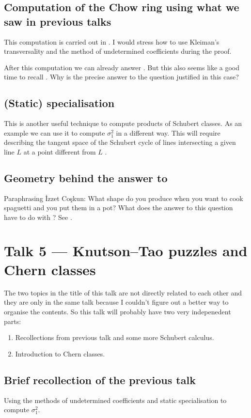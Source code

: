 \documentclass[A4paper, 12pt, british, reqno]{amsart}
\theoremstyle{plain}
\theoremstyle{definition}
\theoremstyle{remark}
\theoremstyle{plain}
\theoremstyle{definition}
\theoremstyle{remark}
\theoremstyle{plain}
\theoremstyle{definition}
\theoremstyle{remark}
\begin{document}
\subsection{Computation of the Chow ring using what we saw in previous talks}
This computation is carried out in \cite[Thm.~3.10]{eh16}.
I would stress how to use Kleiman's transversality \cite[Thm.~1.7]{eh16} and the method of undetermined coefficients during the proof.

After this computation we can already answer .
But this also seems like a good time to recall .
Why is the precise answer to the question justified in this case?

\subsection{(Static) specialisation \cite[\S 3.5.1]{eh16}}
This is another useful technique to compute products of Schubert classes.
As an example we can use it to compute $\sigma_{1}^{2}$ in a different way.
This will require describing the tangent space of the Schubert cycle of lines intersecting a given line $L$ at a point different from $L$ \cite[Exe.~3.26]{eh16}.

\subsection{Geometry behind the answer to }
Paraphrasing \.{I}zzet Co\c{s}kun: What shape do you produce when you want to cook spaguetti and you put them in a pot?
What does the answer to this question have to do with ?
See \cite[\S 3.4.1]{eh16}.

\section{Talk 5 --- Knutson--Tao puzzles and Chern classes}

The two topics in the title of this talk are not directly related to each other and they are only in the same talk because I couldn't figure out a better way to organise the contents.
So this talk will probably have two very indepenedent parts:
\begin{enumerate}
    \item Recollections from previous talk and some more Schubert calculus.
    \item Introduction to Chern classes.
\end{enumerate}

\subsection{Brief recollection of the previous talk}
Using the methods of undetermined coefficients and static specialisation to compute $\sigma_{1}^{2}$.
\end{document}
